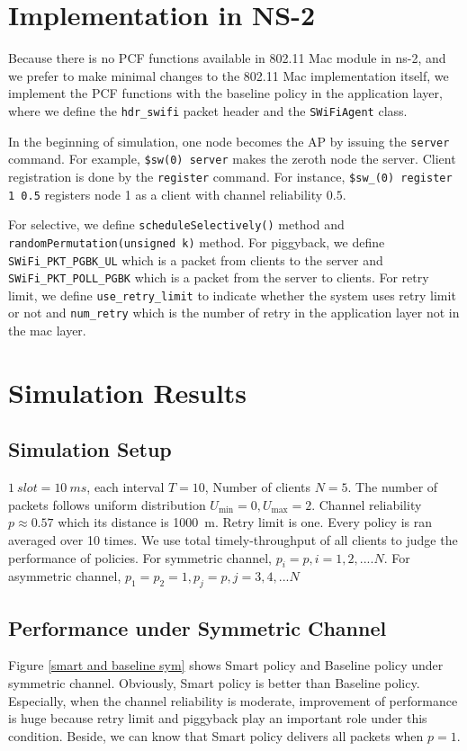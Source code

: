 \documentclass{article}
\begin{document}
\section{Implementation in NS-2}

Because there is no PCF functions available in 802.11 Mac module in ns-2, and we prefer to make minimal changes to the 802.11 Mac implementation itself, we implement the PCF functions with the baseline policy in the application layer, where we define the \lstinline|hdr_swifi| packet header and the \lstinline|SWiFiAgent| class.

In the beginning of simulation, one node becomes the AP by issuing the \lstinline|server| command. For example, \lstinline|$sw(0) server| makes the zeroth node the server. Client registration is done by the \lstinline|register| command. For instance, \lstinline|$sw_(0) register 1 0.5| registers node 1 as a client with channel reliability $0.5$.

For selective, we define \lstinline|scheduleSelectively()| method and \lstinline|randomPermutation(unsigned k)| method. For piggyback, we define \lstinline|SWiFi_PKT_PGBK_UL| which is a packet from clients to the server and \lstinline|SWiFi_PKT_POLL_PGBK| which is a packet from the server to clients. For retry limit, we define \lstinline|use_retry_limit| to indicate whether the system uses retry limit or not and \lstinline|num_retry| which is the number of retry in the application layer not in the mac layer. 


\section{Simulation Results}
\subsection{Simulation Setup}
$\SI{1}{slot} = \SI{10}{ms}$, each interval $T=10$, Number of clients $N=5$. The number of packets follows uniform distribution $U_\text{min}=0, U_\text{max}=2$. Channel reliability $p\approx0.57$ which its distance is \SI{1000}{m}. Retry limit is one. Every policy is ran averaged over 10 times. We use total timely-throughput of all clients to judge the performance of policies. For symmetric channel, $p_i = p, i=1,2,....N$. For asymmetric channel, $p_1 = p_2 = 1, p_j = p, j = 3,4,...N$

\subsection{Performance under Symmetric Channel}
Figure \ref{smart and baseline sym} shows Smart policy and Baseline policy under symmetric channel. Obviously, Smart policy is better than Baseline policy. Especially, when the channel reliability is moderate, improvement of performance is huge because retry limit and piggyback play an important role under this condition. Beside, we can know that Smart policy delivers all packets when $p=1$. \\
\end{document}
